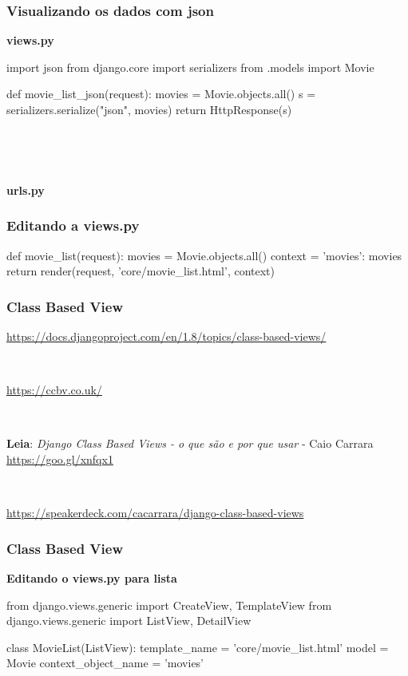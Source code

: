 \documentclass[aspectratio=169]{beamer}
\begin{document}
\begin{frame}[fragile]\frametitle{Visualizando os dados com json}

\textbf{views.py}

\begin{pythoncode}
import json
from django.core import serializers
from .models import Movie

def movie_list_json(request):
    movies = Movie.objects.all()
    s = serializers.serialize("json", movies)
    return HttpResponse(s)
\end{pythoncode}

\

\

\textbf{urls.py}


\end{frame}




\begin{frame}[fragile]\frametitle{Editando a views.py}

\begin{pythoncode}
def movie_list(request):
    movies = Movie.objects.all()
    context = {'movies': movies}
    return render(request, 'core/movie_list.html', context)
\end{pythoncode}

\end{frame}


\begin{frame}[fragile]\frametitle{Class Based View}

\url{https://docs.djangoproject.com/en/1.8/topics/class-based-views/}

\

\url{https://ccbv.co.uk/}

\

\textbf{Leia}: \emph{Django Class Based Views - o que s\~ao e por que usar} - Caio Carrara \url{https://goo.gl/xnfqx1}

\

\url{https://speakerdeck.com/cacarrara/django-class-based-views}

\end{frame}


\begin{frame}[fragile]\frametitle{Class Based View}

\textbf{Editando o views.py para lista}

\begin{pythoncode}
from django.views.generic import CreateView, TemplateView
from django.views.generic import ListView, DetailView

class MovieList(ListView):
    template_name = 'core/movie_list.html'
    model = Movie
    context_object_name = 'movies'
\end{pythoncode}


\end{frame}
\end{document}
